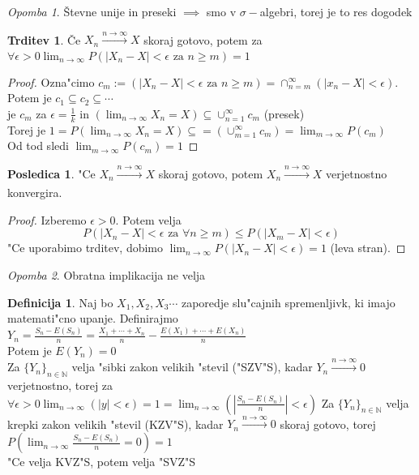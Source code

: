 \documentclass[a4paper,12pt]{article}
\theoremstyle{definition}
\newtheorem{defn}[counter]{Definicija}
\newtheorem{conseq}[counter]{Posledica}
\newtheorem{claim}[counter]{Trditev}
\theoremstyle{remark}
\newtheorem*{rem}{Opomba}
\newcommand{\N}{\mathbb{N}}
\begin{document}
\begin{rem}
    Števne unije in preseki $\implies$ smo v $\sigma-$algebri, torej je to res dogodek
\end{rem}

\begin{claim}
    Če $X_n \xrightarrow[]{n \to \infty} X$ skoraj gotovo, potem za $\forall \epsilon > 0
    \lim_{n \to \infty} P(|X_n - X| < \epsilon \text{ za } n \geq m) = 1$
\end{claim}

\begin{proof}
    Ozna"cimo $c_m := (|X_n - X| < \epsilon \text{ za } n \geq m) = \cap_{n=m}^{\infty} (|x_n - X| < \epsilon)$. \\
    Potem je $c_1 \subseteq c_2 \subseteq \cdots$ \\
    \* je $c_m$ za $\epsilon = \frac{1}{k}$ in $(\lim_{n \to \infty} X_n = X) \subseteq \cup_{n=1}^{\infty} c_m$ (presek) \\
    Torej je $1 = P(\lim_{n \to \infty} X_n = X) \subseteq =(\cup_{m=1}^{\infty} c_m) = \lim_{m \to \infty} P(c_m)$ \\
    Od tod sledi $\lim_{m \to \infty} P(c_m) = 1$
\end{proof}

\begin{conseq}
    "Ce $X_n \xrightarrow[]{n \to \infty} X$ skoraj gotovo, potem $X_n \xrightarrow[]{n \to \infty} X$ verjetnostno konvergira.
\end{conseq}

\begin{proof}
    Izberemo $\epsilon > 0$. Potem velja
    \[P(|X_n - X| < \epsilon \text{ za } \forall n \geq m) \leq P(|X_m - X| < \epsilon)\]
    "Ce uporabimo trditev, dobimo $\lim_{n \to \infty} P(|X_n - X| < \epsilon) = 1$ (leva stran). %
\end{proof}

\begin{rem}
    Obratna implikacija ne velja
\end{rem}




\begin{defn}
    Naj bo $X_1, X_2, X_3 \cdots$ zaporedje slu"cajnih spremenljivk, ki imajo matemati"cno upanje.
    Definirajmo $Y_n = \frac{S_n - E(S_n)}{n} = \frac{X_1 + \cdots + X_n}{n} - \frac{E(X_1) + \cdots + E(X_n)}{n}$ \\
    Potem je $E(Y_n) = 0$ \\
    Za $\{Y_n\}_{n \in \N}$ velja "sibki zakon velikih "stevil ("SZV"S), kadar $Y_n \stackrel{n \to \infty}{\rightarrow} 0$
    verjetnostno, torej za $\forall \epsilon > 0 \lim_{n \to \infty} (|y| < \epsilon) = 1 =
    \lim_{n \to \infty} (|\frac{S_n - E(S_n)}{n}| < \epsilon)$
    Za $\{Y_n\}_{n \in \N}$ velja krepki zakon velikih "stevil (KZV"S), kadar $Y_n \stackrel{n \to \infty}{\rightarrow} 0$
    skoraj gotovo, torej $P(\lim_{n \to \infty} \frac{S_n - E(S_n)}{n} = 0) = 1$ \\
    "Ce velja KVZ"S, potem velja "SVZ"S
\end{defn}
\end{document}
